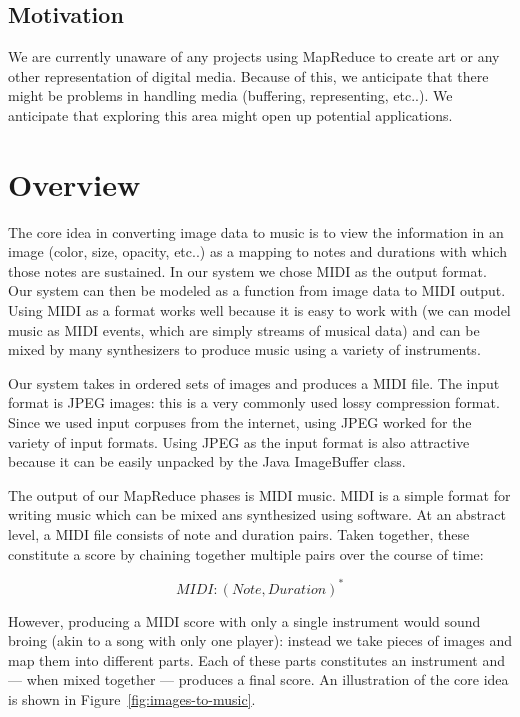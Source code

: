 \documentclass[10pt, conference, compsocconf]{IEEEtran}
\newcommand{\code}[1]{\textsf{\small #1}}
\begin{document}
\subsection{Motivation} 

We are currently unaware of any projects using MapReduce to create art
or any other representation of digital media.  Because of this, we
anticipate that there might be problems in handling media (buffering,
representing, etc..).  We anticipate that exploring this area might
open up potential applications.

\section{Overview}
\label{sec:overview}

The core idea in converting image data to music is to view the
information in an image (color, size, opacity, etc..) as a mapping to
notes and durations with which those notes are sustained.  In our
system we chose MIDI as the output format.  Our system can then be
modeled as a function from image data to MIDI output.  Using MIDI as a
format works well because it is easy to work with (we can model music
as MIDI events, which are simply streams of musical data) and can be
mixed by many synthesizers to produce music using a variety of
instruments.

Our system takes in ordered sets of images and produces a MIDI file.
The input format is JPEG images: this is a very commonly used lossy
compression format.  Since we used input corpuses from the internet,
using JPEG worked for the variety of input formats.  Using JPEG as the
input format is also attractive because it can be easily unpacked by
the Java \code{ImageBuffer} class.  

The output of our MapReduce phases is MIDI music.  MIDI is a simple
format for writing music which can be mixed ans synthesized using
software.  At an abstract level, a MIDI file consists of note and
duration pairs.  Taken together, these constitute a score by chaining
together multiple pairs over the course of time:

\[
MIDI : (Note,Duration)^{\ast}
\]

However, producing a MIDI score with only a single instrument would
sound broing (akin to a song with only one player): instead we take
pieces of images and map them into different parts.  Each of these
parts constitutes an instrument and --- when mixed together ---
produces a final score.  An illustration of the core idea is shown in
Figure~\ref{fig:images-to-music}.
\end{document}
